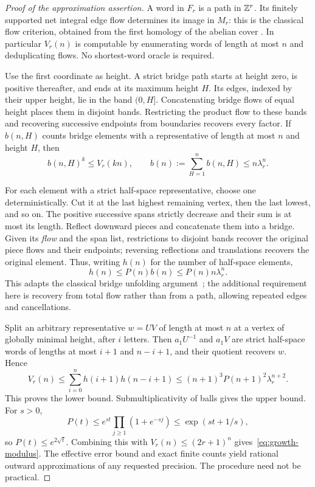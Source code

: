 \begin{proof}[Proof of the approximation assertion]
A word in $F_r$ is a path in $\mathbb Z^r$. Its finitely supported net
integral edge flow determines its image in $M_r$: this is the classical
flow criterion, obtained from the first homology of the abelian cover
\cite{guba,mruv}. In particular $V_r(n)$ is computable by enumerating
words of length at most $n$ and deduplicating flows. No shortest-word
oracle is required.

Use the first coordinate as height. A strict bridge path starts at
height zero, is positive thereafter, and ends at its maximum height $H$.
Its edges, indexed by their upper height, lie in the band $(0,H]$.
Concatenating bridge flows of equal height places them in disjoint
bands. Restricting the product flow to these bands and recovering
successive endpoints from boundaries recovers every factor. If
$b(n,H)$ counts bridge elements with a representative of length at
most $n$ and height $H$, then
\[
 b(n,H)^k\le V_r(kn),\qquad
 b(n):=\sum_{H=1}^n b(n,H)\le n\lambda_r^n.
\]

For each element with a strict half-space representative, choose one
deterministically. Cut it at the last highest remaining vertex, then
the last lowest, and so on. The positive successive spans strictly
decrease and their sum is at most its length. Reflect downward pieces
and concatenate them into a bridge. Given its \emph{flow} and the
span list, restrictions to disjoint bands recover the original piece
flows and their endpoints; reversing reflections and translations
recovers the original element. Thus, writing $h(n)$ for the number
of half-space elements,
\[
 h(n)\le P(n)b(n)\le P(n)n\lambda_r^n.
\]
This adapts the classical bridge unfolding argument~\cite{hw}; the
additional requirement here is recovery from total flow rather than
from a path, allowing repeated edges and cancellations.

Split an arbitrary representative $w=UV$ of length at most $n$ at a
vertex of globally minimal height, after $i$ letters. Then
$a_1U^{-1}$ and $a_1V$ are strict half-space words of lengths at most
$i+1$ and $n-i+1$, and their quotient recovers $w$. Hence
\[
 V_r(n)\le\sum_{i=0}^n h(i+1)h(n-i+1)
 \le(n+1)^3P(n+1)^2\lambda_r^{n+2}.
\]
This proves the lower bound. Submultiplicativity of balls gives the
upper bound. For $s>0$,
\[
 P(t)\le e^{st}\prod_{j\ge1}(1+e^{-sj})
 \le\exp(st+1/s),
\]
so $P(t)\le e^{2\sqrt t}$. Combining this with
$V_r(n)\le(2r+1)^n$ gives~\eqref{eq:growth-modulus}. The effective
error bound and exact finite counts yield rational outward approximations
of any requested precision. The procedure need not be practical.
\end{proof}


